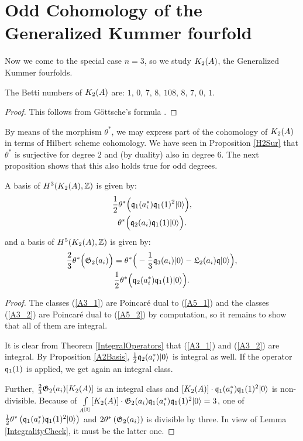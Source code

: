\section{Odd Cohomology of the Generalized Kummer fourfold}
Now we come to the special case $n=3$, so we study $\kum{A}{2}$, the Generalized Kummer fourfolds.
\begin{proposition}
The Betti numbers of $\kum{A}{2}$ are:
$
1,\,0,\,7,\,8,\,108,\,8,\,7,\,0,\,1.
$
\end{proposition}
\begin{proof}
This follows from G\"ottsche's formula \cite[page 49]{Gottsche}.
\end{proof}

By means of the morphism $\theta^*$, we may express part of the cohomology of $\kum{A}{2}$ in terms of Hilbert scheme cohomology. We have seen in Proposition \ref{H2Sur} that $\theta^*$ is surjective for degree $2$ and (by duality) also in degree $6$. 
The next proposition shows that this also holds true for odd degrees.
\begin{proposition}\label{oddcohomology}
A basis of $H^3(\X,\Z)$ is given by:
\begin{gather}
\label{A3_1}
\frac{1}{2}\theta^*\Big( \q_1(a^*_i)\q_1(1)^2\vac \Big), \\
\label{A3_2}
\theta^*\Big(\q_2(a_i)\q_1(1)\vac\Big).
\end{gather}
and a basis of $H^5(\X,\Z)$ is given by:
\begin{gather}
\label{A5_1}
\frac{2}{3} \theta^*\Big( \G_2(a_i) \Big) = \theta^*\Big( -\frac{1}{3}\q_3(a_i)\vac -\mathfrak{L}_2(a_i)\q \vac \Big), \\
\label{A5_2}
\frac{1}{2}\theta^*\Big( \q_2(a^*_i)\q_1(1)\vac \Big).
\end{gather}
\end{proposition}
\begin{proof}
The classes (\ref{A3_1}) are Poincar\'e dual to (\ref{A5_1}) and the classes (\ref{A3_2}) are Poincar\'e dual to (\ref{A5_2}) by computation, so it remains to show that all of them are integral.

It is clear from Theorem \ref{IntegralOperators} that (\ref{A3_1}) and (\ref{A3_2}) are integral. By Proposition \ref{A2Basis}, $\frac{1}{2}\q_2(a^*_i)\vac$ is integral as well. If the operator $ \q_1(1)$ is applied, we get again an integral class.

Further, $\frac{2}{3} \G_2(a_i)[\kum{A}{2}]$ is an integral class and $[\kum{A}{2}]\cdot\q_1(a^*_i)\q_1(1)^2\vac$ is non-divisible. 
Because of $\int\limits_{A\hilb{3}} [\kum{A}{2}]\cdot \G_2(a_i)  \q_1(a^*_i)\q_1(1)^2\vac = 3$, one of $\frac{1}{2}\theta^*\left( \q_1(a^*_i)\q_1(1)^2\vac \right)$ and $ 2\theta^*\left( \G_2(a_i) \right)$ is divisible by three. In view of Lemma \ref{IntegralityCheck}, it must be the latter one.
\end{proof}
